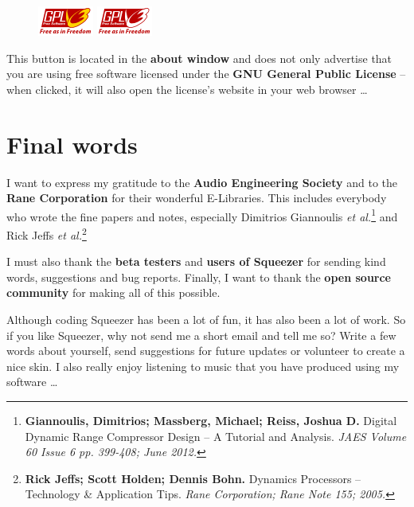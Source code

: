 \begin{figure}
  \includegraphics[scale=\screenshotscale,clip]{include/images/button_gpl_on.png}
  \newline \vspace{-0.9\baselineskip}
  \includegraphics[scale=\screenshotscale,clip]{include/images/button_gpl_off.png}
\end{figure}

This button is located in the \textbf{about window} and does not only
advertise that you are using free software licensed under the
\textbf{GNU General Public License} -- when clicked, it will also open
the license's website in your web browser \dots

\chapter{Final words}
\label{chap:final_words}

I want to express my gratitude to the \textbf{Audio Engineering
  Society} and to the \textbf{Rane Corporation} for their wonderful
E-Libraries.  This includes everybody who wrote the fine papers and
notes, especially Dimitrios Giannoulis \emph{et
  al.}\footnote{\textbf{Giannoulis, Dimitrios; Massberg, Michael;
    Reiss, Joshua D.}  Digital Dynamic Range Compressor Design -- A
  Tutorial and Analysis. \emph{JAES Volume 60 Issue 6 pp. 399-408;
    June 2012.}} and Rick Jeffs \emph{et al.}\footnote{\textbf{Rick
    Jeffs; Scott Holden; Dennis Bohn.}  Dynamics Processors --
  Technology \& Application Tips.  \emph{Rane Corporation; Rane Note
    155; 2005.}}

I must also thank the \textbf{beta testers} and \textbf{users of
  Squeezer} for sending kind words, suggestions and bug reports.
Finally, I want to thank the \textbf{open source community} for making
all of this possible.

Although coding Squeezer has been a lot of fun, it has also been a lot
of work.  So if you like Squeezer, why not send me a short email and
tell me so?  Write a few words about yourself, send suggestions for
future updates or volunteer to create a nice skin.  I also really
enjoy listening to music that you have produced using my software
\dots

